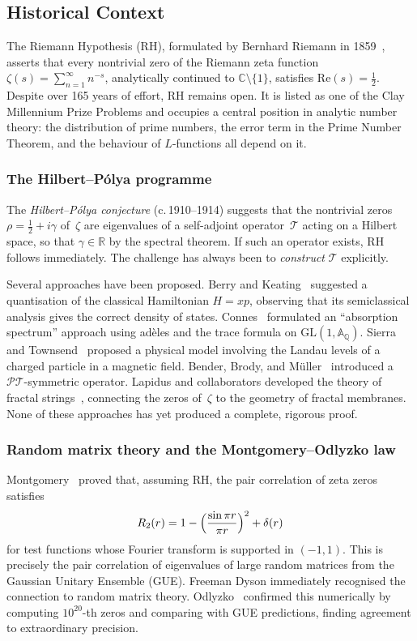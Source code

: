 \documentclass[11pt,a4paper]{article}
\theoremstyle{plain}
\theoremstyle{remark}
\newcommand{\C}{\mathbb{C}}
\newcommand{\R}{\mathbb{R}}
\newcommand{\Q}{\mathbb{Q}}
\begin{document}
\subsection{Historical Context}

The Riemann Hypothesis (RH), formulated by Bernhard Riemann in 1859~\cite{riemann1859},
asserts that every nontrivial zero of the Riemann zeta function
$\zeta(s)=\sum_{n=1}^\infty n^{-s}$, analytically continued to
$\C\setminus\{1\}$, satisfies $\mathrm{Re}(s)=\tfrac{1}{2}$.
Despite over 165 years of effort, RH remains open.  It is listed as one of
the Clay Millennium Prize Problems and occupies a central position in
analytic number theory: the distribution of prime numbers, the error term
in the Prime Number Theorem, and the behaviour of $L$-functions all depend
on it.

\subsubsection{The Hilbert--P\'olya programme}
The \emph{Hilbert--P\'olya conjecture} (c.\,1910--1914) suggests that the
nontrivial zeros $\rho=\tfrac{1}{2}+i\gamma$ of~$\zeta$ are eigenvalues of
a self-adjoint operator~$\mathcal{T}$ acting on a Hilbert space, so that
$\gamma\in\R$ by the spectral theorem.  If such an operator exists, RH
follows immediately.  The challenge has always been to \emph{construct}
$\mathcal{T}$ explicitly.

Several approaches have been proposed.  Berry and Keating~\cite{berry-keating1999}
suggested a quantisation of the classical Hamiltonian $H=xp$, observing that its
semiclassical analysis gives the correct density of states.
Connes~\cite{connes1999} formulated an ``absorption spectrum'' approach using
ad\`eles and the trace formula on $\mathrm{GL}(1,\mathbb{A}_\Q)$.
Sierra and Townsend~\cite{sierra-townsend2008} proposed a physical model
involving the Landau levels of a charged particle in a magnetic field.
Bender, Brody, and M\"uller~\cite{bender-brody-muller2017} introduced a
$\mathcal{PT}$-symmetric operator.  Lapidus and collaborators developed
the theory of fractal strings~\cite{lapidus2008,herichi-lapidus2019}, connecting
the zeros of~$\zeta$ to the geometry of fractal membranes.  None of these
approaches has yet produced a complete, rigorous proof.

\subsubsection{Random matrix theory and the Montgomery--Odlyzko law}
Montgomery~\cite{montgomery1973} proved that, assuming RH, the pair
correlation of zeta zeros satisfies
\begin{equation}\label{eq:montgomery}
  R_2(r)=1-\Bigl(\frac{\sin\pi r}{\pi r}\Bigr)^2+\delta(r)
\end{equation}
for test functions whose Fourier transform is supported in $(-1,1)$.
This is precisely the pair correlation of eigenvalues of large random
matrices from the Gaussian Unitary Ensemble (GUE).  Freeman Dyson
immediately recognised the connection to random matrix theory.
Odlyzko~\cite{odlyzko1987} confirmed this numerically by computing
$10^{20}$-th zeros and comparing with GUE predictions, finding agreement
to extraordinary precision.
\end{document}
